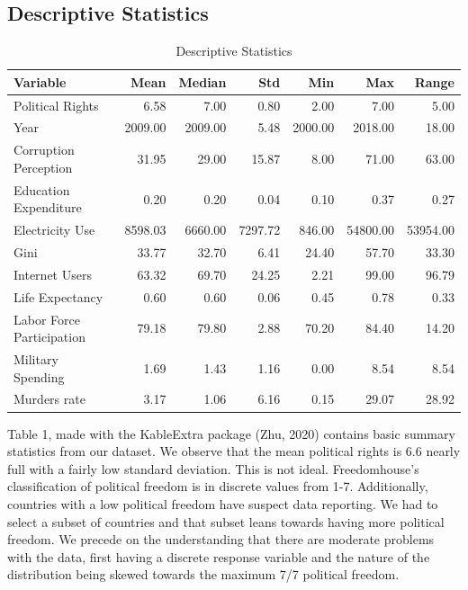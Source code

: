\documentclass[
  english,
  man,floatsintext]{apa6}
\begin{document}
\hypertarget{descriptive-statistics}{%
\subsection{Descriptive Statistics}\label{descriptive-statistics}}

\begin{longtable}[t]{lrrrrrr}
\caption{\label{tab:unnamed-chunk-2}Descriptive Statistics}\\
\toprule
Variable & Mean & Median & Std & Min & Max & Range\\
\midrule
Political Rights & 6.58 & 7.00 & 0.80 & 2.00 & 7.00 & 5.00\\
Year & 2009.00 & 2009.00 & 5.48 & 2000.00 & 2018.00 & 18.00\\
Corruption Perception & 31.95 & 29.00 & 15.87 & 8.00 & 71.00 & 63.00\\
Education Expenditure & 0.20 & 0.20 & 0.04 & 0.10 & 0.37 & 0.27\\
Electricity Use & 8598.03 & 6660.00 & 7297.72 & 846.00 & 54800.00 & 53954.00\\
\addlinespace
Gini & 33.77 & 32.70 & 6.41 & 24.40 & 57.70 & 33.30\\
Internet Users & 63.32 & 69.70 & 24.25 & 2.21 & 99.00 & 96.79\\
Life Expectancy & 0.60 & 0.60 & 0.06 & 0.45 & 0.78 & 0.33\\
Labor Force Participation & 79.18 & 79.80 & 2.88 & 70.20 & 84.40 & 14.20\\
Military Spending & 1.69 & 1.43 & 1.16 & 0.00 & 8.54 & 8.54\\
\addlinespace
Murders rate & 3.17 & 1.06 & 6.16 & 0.15 & 29.07 & 28.92\\
\bottomrule
\end{longtable}

Table 1, made with the KableExtra package (Zhu, 2020) contains basic summary statistics from our dataset. We observe that the mean political rights is 6.6 nearly full with a fairly low standard deviation. This is not ideal. Freedomhouse's classification of political freedom is in discrete values from 1-7. Additionally, countries with a low political freedom have suspect data reporting. We had to select a subset of countries and that subset leans towards having more political freedom. We precede on the understanding that there are moderate problems with the data, first having a discrete response variable and the nature of the distribution being skewed towards the maximum 7/7 political freedom.
\end{document}
